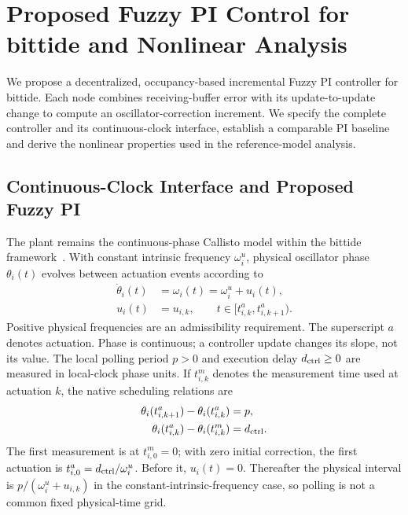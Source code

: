 \section{Proposed Fuzzy PI Control for bittide and Nonlinear Analysis}
\label{sec:fpi_controller}

We propose a decentralized, occupancy-based incremental Fuzzy PI controller
for bittide. Each node combines receiving-buffer error with its
update-to-update change to compute an oscillator-correction increment.
We specify the complete controller and its continuous-clock interface,
establish a comparable PI baseline and derive the nonlinear properties
used in the reference-model analysis.

\subsection{Continuous-Clock Interface and Proposed Fuzzy PI}
\label{subsec:fpi_laws}

The plant remains the continuous-phase Callisto model within the bittide
framework~\cite{lall2024logicalSynchrony}. With constant
intrinsic frequency $\omega_i^u$, physical oscillator phase $\theta_i(t)$
evolves between actuation events according to
\begin{align}
 \dot\theta_i(t)&=\omega_i(t)=\omega_i^u+u_i(t),\nonumber\\
 u_i(t)&=u_{i,k},\qquad t\in[t^a_{i,k},t^a_{i,k+1}).
 \label{eq:fpi_continuous_plant}
\end{align}
Positive physical frequencies are an admissibility requirement.
The superscript $a$ denotes actuation. Phase is continuous; a controller
update changes its slope, not its value. The local polling period $p>0$
and execution delay $d_{\rm ctrl}\ge0$ are measured in local-clock phase
units. If $t^m_{i,k}$ denotes the measurement time used at actuation $k$,
the native scheduling relations are
\begin{align}
 \theta_i(t^a_{i,k+1})-\theta_i(t^a_{i,k})&=p,\nonumber\\
 \theta_i(t^a_{i,k})-\theta_i(t^m_{i,k})&=d_{\rm ctrl}.
 \label{eq:fpi_local_schedule}
\end{align}
The first measurement is at $t^m_{i,0}=0$; with zero initial correction,
the first actuation is $t^a_{i,0}=d_{\rm ctrl}/\omega_i^u$.
Before it, $u_i(t)=0$. Thereafter the physical interval is
$p/(\omega_i^u+u_{i,k})$ in the constant-intrinsic-frequency case, so
polling is not a common fixed physical-time grid.

